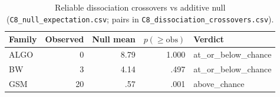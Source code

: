 \begin{table}[t]
\centering
\small
\caption{Reliable dissociation crossovers vs additive null
(\texttt{C8\_null\_expectation.csv}; pairs in
\texttt{C8\_dissociation\_crossovers.csv}).}
\label{tab:c8}
\begin{tabular}{lrrrl}
\toprule
Family & Observed & Null mean & $p(\ge\mathrm{obs})$ & Verdict \\
\midrule
ALGO & 0 & 8.79 & 1.000 & at\_or\_below\_chance \\
BW & 3 & 4.14 & .497 & at\_or\_below\_chance \\
GSM & 20 & .57 & .001 & above\_chance \\
\bottomrule
\end{tabular}
\end{table}

